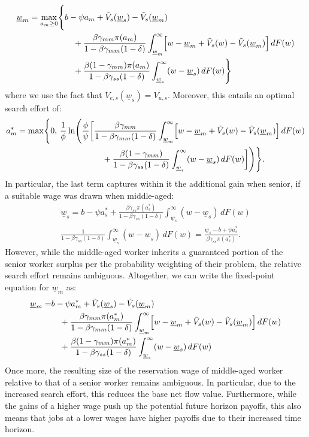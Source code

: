 \documentclass{article}
\newcommand{\lbar}[1]{\underline{#1}} %
\begin{document}
\begin{align*}
\lbar{w}_m
=
\max_{a_m\geq 0}
\Biggl\{
& b-\psi a_m
+\tilde V_s(\lbar w_s)-\tilde V_s(\lbar w_m) \\
&\quad
+\frac{\beta\gamma_{mm}\pi(a_m)}
{1-\beta\gamma_{mm}(1-\delta)}
\int_{\lbar{w}_m}^{\infty}
\Bigl[
w-\lbar{w}_m+\tilde V_s(w)-\tilde V_s(\lbar{w}_m)
\Bigr]\,dF(w) \\
&\quad
+\frac{\beta(1-\gamma_{mm})\pi(a_m)}
{1-\beta\gamma_{ss}(1-\delta)}
\int_{\lbar{w}_s}^{\infty}
(w-\lbar{w}_s)\,dF(w)
\Biggr\}
\end{align*}
where we use the fact that $V_{e,s}(\lbar{w}_s)=V_{u,s}$. Moreover, this entails an optimal search effort of:
\begin{align*}
a_m^*
=
\max\Biggl\{
0,\,
\frac{1}{\phi}
\ln\Biggl(\frac{\phi}{\psi}\biggl[
&\frac{
\beta\gamma_{mm}}
{1-\beta\gamma_{mm}(1-\delta)}
\int_{\lbar{w}_m}^{\infty}
\Bigl[
w-\lbar{w}_m+\tilde V_s(w)-\tilde V_s(\lbar{w}_m)
\Bigr]\,dF(w)\\
&\quad
+\frac{\beta(1-\gamma_{mm})}
{1-\beta\gamma_{ss}(1-\delta)}
\int_{\lbar{w}_s}^{\infty}
(w-\lbar{w}_s)\,dF(w)
\biggr]\Biggr)
\Biggr\}.
\end{align*}
In particular, the last term captures within it the additional gain when senior, if a suitable wage was drawn when middle-aged:
\begin{align*}
\lbar w_s=b-\psi a_s^*+
\frac{\beta\gamma_{ss}\pi(a_s^*)}
{1-\beta\gamma_{ss}(1-\delta)}
\int_{\lbar w_s}^{\infty}(w-\lbar w_s)\,dF(w)\\
\frac{1}{1-\beta\gamma_{ss}(1-\delta)}
\int_{\lbar w_s}^{\infty}(w-\lbar w_s)\,dF(w)
=
\frac{\lbar w_s-b+\psi a_s^*}
{\beta\gamma_{ss}\pi(a_s^*)}.
\end{align*}
However, while the middle-aged worker inherits a guaranteed portion of the senior worker surplus per the probability weighting of their problem, the relative search effort remains ambiguous. Altogether, we can write the fixed-point equation for $\lbar{w}_m$ as:
\begin{align*}
\lbar{w}_m
=
& b-\psi a^*_m
+\tilde V_s(\lbar w_s)-\tilde V_s(\lbar w_m) \\
&\quad
+\frac{\beta\gamma_{mm}\pi(a^*_m)}
{1-\beta\gamma_{mm}(1-\delta)}
\int_{\lbar{w}_m}^{\infty}
\Bigl[
w-\lbar{w}_m+\tilde V_s(w)-\tilde V_s(\lbar{w}_m)
\Bigr]\,dF(w) \\
&\quad
+\frac{\beta(1-\gamma_{mm})\pi(a^*_m)}
{1-\beta\gamma_{ss}(1-\delta)}
\int_{\lbar{w}_s}^{\infty}
(w-\lbar{w}_s)\,dF(w)
\end{align*}
Once more, the resulting size of the reservation wage of middle-aged worker relative to that of a senior worker remains ambiguous. In particular, due to the increased search effort, this reduces the base net flow value. Furthermore, while the gains of a higher wage push up the potential future horizon payoffs, this also means that jobs at a lower wages have higher payoffs due to their increased time horizon.
\end{document}
